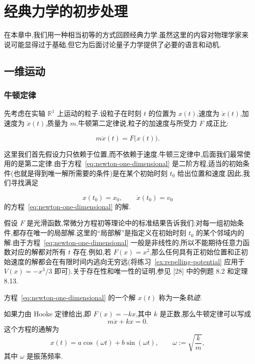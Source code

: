 \chapter{经典力学的初步处理}\label{chap:first-classical-mechanics}

在本章中,我们用一种相当初等的方式回顾经典力学.虽然这里的内容对物理学家来说可能显得过于基础,但它为后面讨论量子力学提供了必要的语言和动机.

\section{一维运动}

\subsection{牛顿定律}

先考虑在实轴 $\mathbb{R}^{1}$ 上运动的粒子.设粒子在时刻 $t$ 的位置为 $x(t)$,速度为 $\dot{x}(t)$,加速度为 $\ddot{x}(t)$,质量为 $m$.牛顿第二定律说,粒子的加速度与所受力 $F$ 成正比:

\begin{equation}
  m\ddot{x}(t)=F\bigl(x(t)\bigr).
  \label{eq:newton-one-dimensional}
\end{equation}

这里我们首先假设力只依赖于位置,而不依赖于速度.牛顿三定律中,后面我们最常使用的是第二定律.由于方程~\eqref{eq:newton-one-dimensional} 是二阶方程,适当的初始条件(也就是得到唯一解所需要的条件)是在某个初始时刻 $t_{0}$ 给出位置和速度.因此,我们寻找满足

\[
  x(t_{0})=x_{0},\qquad \dot{x}(t_{0})=v_{0}
\]
的方程~\eqref{eq:newton-one-dimensional} 的解.

假设 $F$ 是光滑函数,常微分方程初等理论中的标准结果告诉我们:对每一组初始条件,都存在唯一的局部解.这里的“局部解”是指定义在初始时刻 $t_{0}$ 的某个邻域内的解.由于方程~\eqref{eq:newton-one-dimensional} 一般是非线性的,所以不能期待任意力函数对应的解都对所有 $t$ 存在.例如,若 $F(x)=x^{2}$,那么任何具有正初始位置和正初始速度的解都会在有限时间内逃向无穷远(将练习~\ref{ex:repelling-potential} 应用于 $V(x)=-x^{3}/3$ 即可).关于存在性和唯一性的证明,参见 [28] 中的例题 8.2 和定理 8.13.

\begin{definition}[轨迹]\label{def:trajectory}
方程~\eqref{eq:newton-one-dimensional} 的一个解 $x(t)$ 称为一条\emph{轨迹}.
\end{definition}

\begin{example}[谐振子]\label{ex:harmonic-oscillator}
如果力由 Hooke 定律给出,即 $F(x)=-kx$,其中 $k$ 是正数,那么牛顿定律可以写成
\[
  m\ddot{x}+kx=0.
\]
这个方程的通解为
\begin{equation}
  x(t)=a\cos(\omega t)+b\sin(\omega t),
  \qquad \omega:=\sqrt{\frac{k}{m}},
  \label{eq:harmonic-oscillator-solution}
\end{equation}
其中 $\omega$ 是振荡频率.
\end{example}


